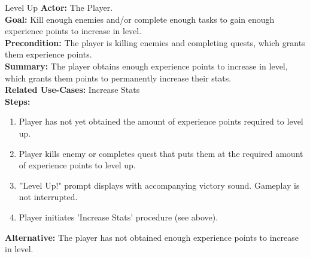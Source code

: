 \documentclass[12pt]{report}
\begin{document}
\begin{subsection}{Level Up}
\textbf{Actor:} The Player. \\
\textbf{Goal:} Kill enough enemies and/or complete enough tasks to gain enough experience points to increase in level. \\
\textbf{Precondition:} The player is killing enemies and completing quests, which grants them experience points. \\
\textbf{Summary:} The player obtains enough experience points to increase in level, which grants them points to permanently increase their stats. \\
\textbf{Related Use-Cases:} Increase Stats \\
\textbf{Steps:}
\begin{enumerate}
	\item Player has not yet obtained the amount of experience points required to level up.
	\item Player kills enemy or completes quest that puts them at the required amount of experience points to level up.
	\item ''Level Up!" prompt displays with accompanying victory sound. Gameplay is not interrupted.
	\item Player initiates 'Increase Stats' procedure (see above).
\end{enumerate}
\textbf{Alternative:} The player has not obtained enough experience points to increase in level.
\end{subsection}
\end{document}
